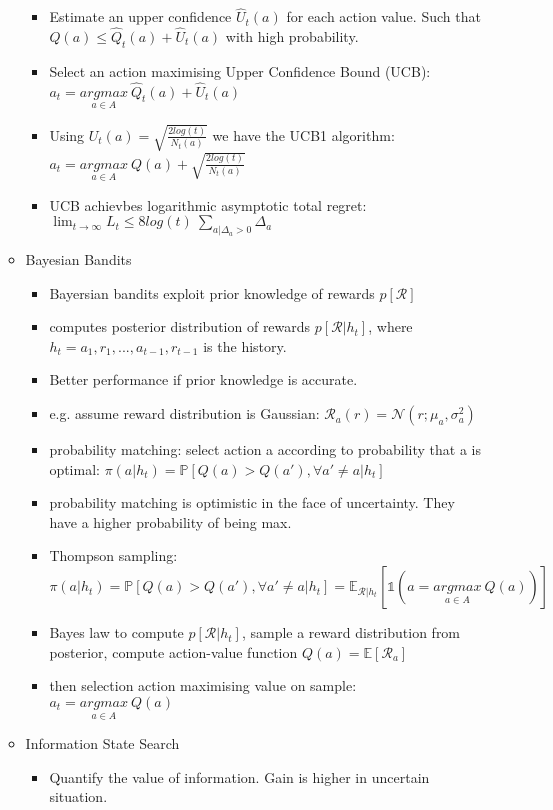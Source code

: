 \begin{itemize}
\begin{itemize}[noitemsep,nolistsep]
\begin{itemize}[noitemsep,nolistsep]
			\item Estimate an upper confidence $\hat{U}_t(a)$ for each action value. Such that $Q(a) \leq \hat{Q}_t(a) + \hat{U}_t(a)$ with high probability.
			\item Select an action maximising Upper Confidence Bound (UCB): $a_t = \underset{a \in A}{argmax}\ \hat{Q}_t(a) + \hat{U}_t(a)$
			\item Using $U_t(a) = \sqrt{\frac{2 log(t)}{N_t(a)}}$ we have the UCB1 algorithm: $a_t = \underset{a \in A}{argmax}\ Q(a) + \sqrt{\frac{2 log(t)}{N_t(a)}}$
			\item UCB achievbes logarithmic asymptotic total regret: $\lim_{t \rightarrow \infty} L_t \leq 8 log(t)\ \sum_{a|\Delta_a > 0} \Delta_a$
		\end{itemize}
		\item Bayesian Bandits
		\begin{itemize}[noitemsep,nolistsep]
			\item Bayersian bandits exploit prior knowledge of rewards $p[\mathcal{R}]$
			\item computes posterior distribution of rewards $p[\mathcal{R}|h_t]$, where $h_t = a_1,r_1,...,a_{t-1},r_{t-1}$ is the history.
			\item Better performance if prior knowledge is accurate.
			\item e.g. assume reward distribution is Gaussian: $\mathcal{R}_a(r) = \mathcal{N}(r;\mu_a,\sigma_a^2)$
			\item probability matching: select action a according to probability that a is optimal: $\pi(a|h_t) = \mathbb{P}[Q(a) > Q(a'), \forall a' \neq a | h_t]$
			\item probability matching is optimistic in the face of uncertainty. They have a higher probability of being max.
			\item Thompson sampling: $\pi(a|h_t) = \mathbb{P}[Q(a) > Q(a'), \forall a' \neq a | h_t] = \mathbb{E}_{\mathcal{R}|h_t}[\mathbb{1}(a = \underset{a \in A}{argmax}\ Q(a))]$
			\item Bayes law to compute $p[\mathcal{R}|h_t]$, sample a reward distribution from posterior, compute action-value function $Q(a) = \mathbb{E}[\mathcal{R}_a]$
			\item then selection action maximising value on sample: $a_t = \underset{a \in A}{argmax}\ Q(a)$
		\end{itemize}
		\item Information State Search
		\begin{itemize}[noitemsep,nolistsep]
			\item Quantify the value of information. Gain is higher in uncertain situation.

\end{itemize}
\end{itemize}
\end{itemize}
